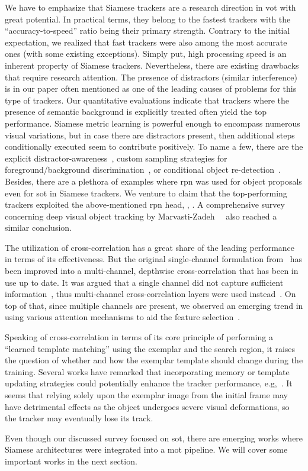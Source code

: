 We have to emphasize that Siamese trackers are a research direction in \gls{vot} with great potential. In practical terms, they belong to the fastest trackers with the ``accuracy-to-speed'' ratio being their primary strength. Contrary to the initial expectation, we realized that fast trackers were also among the most accurate ones (with some existing exceptions). Simply put, high processing speed is an inherent property of Siamese trackers. Nevertheless, there are existing drawbacks that require research attention. The presence of distractors (similar interference) is in our paper often mentioned as one of the leading causes of problems for this type of trackers. Our quantitative evaluations indicate that trackers where the presence of semantic background is explicitly treated often yield the top performance. Siamese metric learning is powerful enough to encompass numerous visual variations, but in case there are distractors present, then additional steps conditionally executed seem to contribute positively. To name a few, there are the explicit distractor-awareness~\cite{zhu2018dasiamrpn}, custom sampling strategies for foreground/background discrimination~\cite{li2020figsiam}, or conditional object re-detection~\cite{li2019siamrm}. Besides, there are a plethora of examples where \gls{rpn} was used for object proposals even for \gls{sot} in Siamese trackers. We venture to claim that the top-performing trackers exploited the above-mentioned \gls{rpn} head, \egtext{}, \cite{li2018siamrpn, zhu2018dasiamrpn, li2018siamrpnpp}. A comprehensive survey concerning deep visual object tracking by Marvasti-Zadeh~\etal{}~\cite{marvastizadeh2021survey} also reached a similar conclusion.

The utilization of cross-correlation has a great share of the leading performance in terms of its effectiveness. But the original single-channel formulation from~\cite{bertinetto2016siamfc} has been improved into a multi-channel, depthwise cross-correlation that has been in use up to date. It was argued that a single channel did not capture sufficient information~\cite{guo2019siamcar}, thus multi-channel cross-correlation layers were used instead~\cite{li2018siamrpnpp}. On top of that, since multiple channels are present, we observed an emerging trend in using various attention mechanisms to aid the feature selection~\cite{wang2018learningattentions}.

Speaking of cross-correlation in terms of its core principle of performing a ``learned template matching'' using the exemplar and the search region, it raises the question of whether and how the exemplar template should change during the training. Several works have remarked that incorporating memory or template updating strategies could potentially enhance the tracker performance, e.g,~\cite{bertinetto2016siamfc, liang2019lssiam}. It seems that relying solely upon the exemplar image from the initial frame may have detrimental effects as the object undergoes severe visual deformations, so the tracker may eventually lose its track.

Even though our discussed survey focused on \gls{sot}, there are emerging works where Siamese architectures were integrated into a \gls{mot} pipeline. We will cover some important works in the next section.
